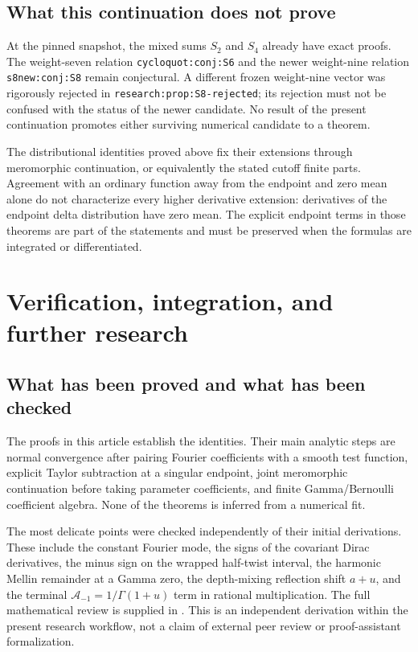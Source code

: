 \documentclass[11pt,letterpaper]{article}
\numberwithin{equation}{section}
\theoremstyle{plain}
\theoremstyle{definition}
\theoremstyle{remark}
\begin{document}
\subsection{What this continuation does not prove}

At the pinned snapshot, the mixed sums $S_2$ and $S_4$ already have
exact proofs.  The weight-seven relation
\texttt{cycloquot:conj:S6} and the newer weight-nine relation
\texttt{s8new:conj:S8} remain conjectural.  A different frozen
weight-nine vector was rigorously rejected in
\texttt{research:prop:S8-rejected}; its rejection must not be confused
with the status of the newer candidate.  No result of the present
continuation promotes either surviving numerical candidate to a theorem.

The distributional identities proved above fix their extensions through
meromorphic continuation, or equivalently the stated cutoff finite parts.
Agreement with an ordinary function away from the endpoint and zero mean
alone do not characterize every higher derivative extension: derivatives
of the endpoint delta distribution have zero mean.  The explicit endpoint
terms in those theorems are part of the statements and must be preserved
when the formulas are integrated or differentiated.



\section{Verification, integration, and further research}
\label{future:sec}

\subsection{What has been proved and what has been checked}

The proofs in this article establish the identities. Their main
analytic steps are normal convergence after pairing Fourier
coefficients with a smooth test function, explicit Taylor subtraction
at a singular endpoint, joint meromorphic continuation before taking
parameter coefficients, and finite Gamma/Bernoulli coefficient
algebra. None of the theorems is inferred from a numerical fit.

The most delicate points were checked independently of their initial
derivations. These include the constant Fourier mode, the signs of
the covariant Dirac derivatives, the minus sign on the wrapped
half-twist interval, the harmonic Mellin remainder at a Gamma zero,
the depth-mixing reflection shift \(a+u\), and the terminal
\(\mathcal A_{-1}=1/\Gamma(1+u)\) term in rational multiplication.
The full mathematical review is supplied in
. This is an independent
derivation within the present research workflow, not a claim of
external peer review or proof-assistant formalization.
\end{document}
